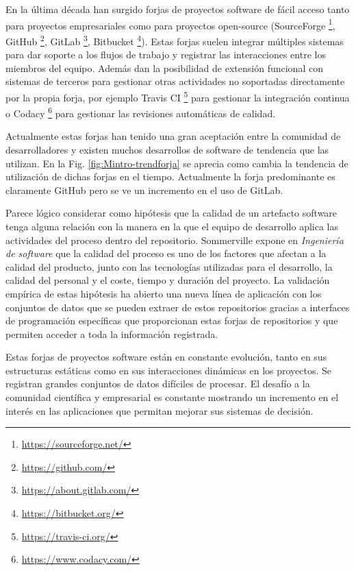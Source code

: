 En la última década han surgido forjas de proyectos software de fácil acceso tanto para proyectos empresariales como para proyectos open-source (SourceForge \footnote{\url{https://sourceforge.net/}}, GitHub \footnote{\url{https://github.com/}}, GitLab \footnote{\url{https://about.gitlab.com/}}, Bitbucket  \footnote{\url{https://bitbucket.org/}}).  Estas forjas suelen integrar múltiples sistemas para dar soporte a los flujos de trabajo y registrar las interacciones entre los miembros del equipo. Además dan la posibilidad de extensión funcional con sistemas de terceros para gestionar otras actividades no soportadas directamente por la propia forja, por ejemplo Travis CI
\footnote{\url{https://travis-ci.org/}} para gestionar la integración continua o Codacy \footnote{\url{https://www.codacy.com/}} para gestionar las revisiones automáticas de calidad. 

Actualmente estas forjas han tenido una gran aceptación entre la comunidad de desarrolladores y existen muchos desarrollos de software de tendencia que las utilizan. En la Fig. \ref{fig:Mintro-trendforja} se aprecia como cambia la tendencia de utilización de dichas forjas en el tiempo. Actualmente la forja predominante es claramente GitHub pero se ve un incremento en el uso de GitLab.


Parece lógico considerar como hipótesis que la calidad de un artefacto software tenga alguna relación con la manera en la que el equipo de desarrollo aplica las actividades del proceso dentro del repositorio. Sommerville expone en \textit{Ingeniería de software} \cite{sommerville_ingenierisoftware_2002} que la calidad del proceso es uno de los factores que afectan a la calidad del producto, junto con las tecnologías utilizadas para el desarrollo, la calidad del personal y el coste, tiempo y duración del proyecto. La validación empírica de estas  hipótesis ha abierto una nueva línea de aplicación con los conjuntos de datos que se pueden extraer de estos repositorios gracias a interfaces de programación específicas que proporcionan estas forjas de repositorios y que permiten acceder a toda la información registrada.

Estas forjas de proyectos software están en constante evolución, tanto en sus estructuras estáticas como en sus interacciones dinámicas en los proyectos. Se registran grandes conjuntos de datos difíciles de procesar. El  desafío a la comunidad científica y empresarial es constante mostrando un incremento en el interés en las aplicaciones que permitan mejorar sus sistemas de decisión.

